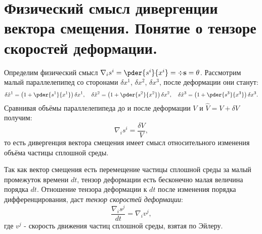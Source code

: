 \chapter{Физический смысл дивергенции вектора смещения. Понятие о тензоре
скоростей деформации.}
Определим физический смысл \( \nabla_is^i = \pder{s^i}{x^i} = \div\vec{s} =
\theta \). Рассмотрим малый параллелепипед со сторонами \( \delta x^1 \),
\( \delta x^2 \), \( \delta x^3 \), после деформации они станут:
\[
	\delta\hat{x}^1 = \left(1 + \pder{s^1}{x^1}\right)\delta x^1,\quad
	\delta\hat{x}^2 = \left(1 + \pder{s^2}{x^2}\right)\delta x^2,\quad
	\delta\hat{x}^3 = \left(1 + \pder{s^3}{x^3}\right)\delta x^3.
\]
Сравнивая объёмы параллелепипеда до и после деформации \( V \) и
\( \hat{V} = V + \delta V \) получим:
\[
	\nabla_is^i = \frac{\delta V}{V},
\]
то есть дивергенция вектора смещения имеет смысл относительного изменения
объёма частицы сплошной среды.

Так как вектор смещения есть перемещение частицы сплошной среды за малый
промежуток времени \( dt \), тензор деформации есть бесконечно малая величина
порядка \( dt \). Отношение тензора деформации к \( dt \) после изменения
порядка дифференцирования, даст \emph{тензор скоростей деформации}:
\[
	\frac{\nabla_is^j}{dt} = \nabla_iv^j,
\]
где \( v^j \) - скорость движения частиц сплошной среды, взятая по Эйлеру.
\newpage
